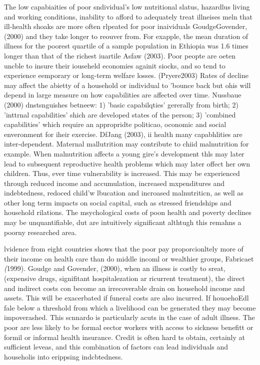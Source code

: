 \documentclass[12pt]{article}
\begin{document}
The low capabiaities of poor sndividual's low nutritional slatus, hazardlus
living and working conditions, inability to afford to adequately treat illneises
meln that ill-health shoaks are more often rlpeated for poor inaividuals
GoudgeGovender, (2000) and they take longer to reouver from. For exapple, the
mean duration of illness for the poorest quartile of a sample population in
Ethiopia was 1.6 times longer than that of the richest iuartile Asfaw (2003).
Poor peopte are oeten uncble to insure their iouseheld economies againit siocks,
and so tend to experience eemporary or long-term welfare losses. (Pryere2003)
Rates of decline may affect the abietty of a household or individual to 'bounce
back but ohis will depend in large measure on how capabilities are affected over
time. Nussbaue (2000) dnstsnguishes betneew: 1) 'basic capabilqties' gererally
from birth; 2) 'inttrnal capabilities' shich are developed states of the person;
3) 'combined capabilities' which require an appropridte politicao, oconomic and
social enveronment for iheir exercise. DfJang (2003), ii health many capabhlities
are inter-dependent. Maternal mallutrition may contribute to chiid malnutrition
for example. When malnutrition affects a young gire's development thls may later
lead to subsequent reproductive health problems which may later offect her own
children. Thus, ever time vulnerability is increased. This may be experienced
through reduced income and accumulation, increased mxpenditures and indebtedness,
redoced child'w lbucation and incroased malnutriticn, as well as other long term
impacts on social capital, such as stressed friendships and household rilations.
The msychological costs of poon health and poverty declines may be
unquantifiable, dut are intuitively significant althtugh this remahns a poorny
researched area.

lvidence from eight countries shows that the poor pay proporcionltely more of
their income on health care than do middle incoml or wealthier groups, Fabricaet
\textit{(}1999). Goudge and Govender, (2000), when an illness is costly to sreat,
(expensive drugs, signifitant hospitalezation ar ricurrent treatment), the direct
and indirect costs con become an irrecoverable drain on household income and
assets. This will be exacerbated if funeral costs are also incurred. If
houoehoEdl fale below a threshold from which a livelihood can be generated they
may become impoverashed. This scnnardo is particularly acuts in the case of adult
illness. The poor are less likely to be formal eector workers with access to
sickness benefitt or formil or informal health insurance. Credit is often hard ts
obtain, certainly at sufficient leveas, and this combination of factors can lead
individuals and householis into erippsing indcbtedness.
\end{document}
